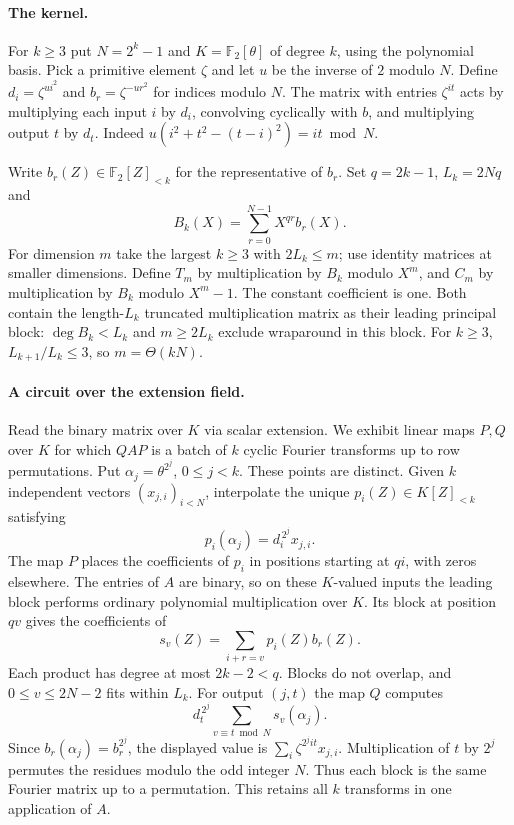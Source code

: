 \documentclass[11pt]{article}
\theoremstyle{definition}
\theoremstyle{remark}
\newcommand{\F}{\mathbb{F}}
\begin{document}
\paragraph{The kernel.}
For $k\ge3$ put $N=2^k-1$ and $K=\F_2[\theta]$ of degree $k$,
using the polynomial basis. Pick a primitive element $\zeta$ and
let $u$ be the inverse of $2$ modulo $N$. Define
$d_i=\zeta^{ui^2}$ and $b_r=\zeta^{-ur^2}$ for indices modulo $N$.
The matrix with entries $\zeta^{it}$ acts by multiplying each input
$i$ by $d_i$, convolving cyclically with $b$, and multiplying output
$t$ by $d_t$. Indeed $u(i^2+t^2-(t-i)^2)=it\bmod N$.

Write $b_r(Z)\in\F_2[Z]_{<k}$ for the representative of $b_r$.
Set $q=2k-1$, $L_k=2Nq$ and
\[
                     B_k(X)=\sum_{r=0}^{N-1}X^{qr}b_r(X).
\]
For dimension $m$ take the largest $k\ge3$ with $2L_k\le m$;
use identity matrices at smaller dimensions. Define $T_m$ by
multiplication by $B_k$ modulo $X^m$, and $C_m$ by multiplication
by $B_k$ modulo $X^m-1$. The constant coefficient is one. Both
contain the length-$L_k$ truncated multiplication matrix as their
leading principal block: $\deg B_k<L_k$ and $m\ge2L_k$ exclude wraparound
in this block. For $k\ge3$, $L_{k+1}/L_k\le3$, so $m=\Theta(kN)$.

\paragraph{A circuit over the extension field.}
Read the binary matrix over $K$ via scalar extension. We exhibit
linear maps $P,Q$ over $K$ for which $QAP$ is a batch of $k$ cyclic
Fourier transforms up to row permutations. Put
$\alpha_j=\theta^{2^j}$, $0\le j<k$. These points are distinct.
Given $k$ independent vectors $(x_{j,i})_{i<N}$, interpolate the
unique $p_i(Z)\in K[Z]_{<k}$ satisfying
\[
                  p_i(\alpha_j)=d_i^{\,2^j}x_{j,i}.
\]
The map $P$ places the coefficients of $p_i$ in positions starting at
$qi$, with zeros elsewhere. The entries of $A$ are binary, so on these
$K$-valued inputs the leading block performs ordinary polynomial
multiplication over $K$. Its block at position $qv$ gives the
coefficients of
\[
                       s_v(Z)=\sum_{i+r=v}p_i(Z)b_r(Z).
\]
Each product has degree at most $2k-2<q$. Blocks do not overlap,
and $0\le v\le 2N-2$ fits within $L_k$. For output $(j,t)$ the map
$Q$ computes
\[
              d_t^{\,2^j}\sum_{v\equiv t\bmod N}s_v(\alpha_j).
\]
Since $b_r(\alpha_j)=b_r^{2^j}$, the displayed value is
$\sum_i\zeta^{2^jit}x_{j,i}$. Multiplication of $t$ by $2^j$
permutes the residues modulo the odd integer $N$. Thus each block
is the same Fourier matrix up to a permutation. This retains all
$k$ transforms in one application of $A$.
\end{document}
